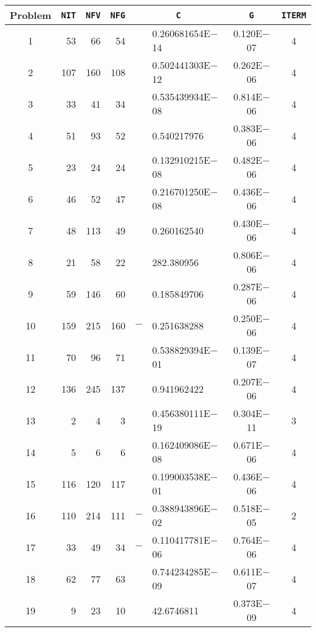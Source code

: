 \documentclass{esub2acm}
\begin{document}
\begin{table}
\footnotesize
\centering
\begin{tabular}{c|rrrr@{}lcc} \hline
Problem\rule[-2pt]{0pt}{12pt} & {\tt NIT} & {\tt NFV} & {\tt NFG} & \multicolumn{2}{c}{\tt C} & {\tt G} & {\tt ITERM} \\ \hline
1\rule[-2pt]{0pt}{12pt} &   53  &   66  &   54  &       &   0.260681654E$-$14   &   0.120E$-$07 &   4   \\
2   &   107 &   160 &   108 &       &   0.502441303E$-$12   &   0.262E$-$06 &   4   \\
3   &   33  &   41  &   34  &       &   0.535439934E$-$08   &   0.814E$-$06 &   4   \\
4   &   51  &   93  &   52  &       &   0.540217976 &   0.383E$-$06 &   4   \\
5   &   23  &   24  &   24  &       &   0.132910215E$-$08   &   0.482E$-$06 &   4   \\
6   &   46  &   52  &   47  &       &   0.216701250E$-$08   &   0.436E$-$06 &   4   \\
7   &   48  &   113 &   49  &       &   0.260162540 &   0.430E$-$06 &   4   \\
8   &   21  &   58  &   22  &       &   282.380956  &   0.806E$-$06 &   4   \\
9   &   59  &   146 &   60  &       &   0.185849706 &   0.287E$-$06 &   4   \\
10  &   159 &   215 &   160 &   $-$ &   0.251638288 &   0.250E$-$06 &   4   \\
11  &   70  &   96  &   71  &       &   0.538829394E$-$01   &   0.139E$-$07 &   4   \\
12  &   136 &   245 &   137 &       &   0.941962422 &   0.207E$-$06 &   4   \\
13  &   2   &   4   &   3   &       &   0.456380111E$-$19   &   0.304E$-$11 &   3   \\
14  &   5   &   6   &   6   &       &   0.162409086E$-$08   &   0.671E$-$06 &   4   \\
15  &   116 &   120 &   117 &       &   0.199003538E$-$01   &   0.436E$-$06 &   4   \\
16  &   110 &   214 &   111 &   $-$ &   0.388943896E$-$02   &   0.518E$-$05 &   2   \\
17  &   33  &   49  &   34  &   $-$ &   0.110417781E$-$06   &   0.764E$-$06 &   4   \\
18  &   62  &   77  &   63  &       &   0.744234285E$-$09   &   0.611E$-$07 &   4   \\
19  &   9   &   23  &   10  &       &   42.6746811  &   0.373E$-$09 &   4   \\

\end{tabular}
\end{table}
\end{document}
